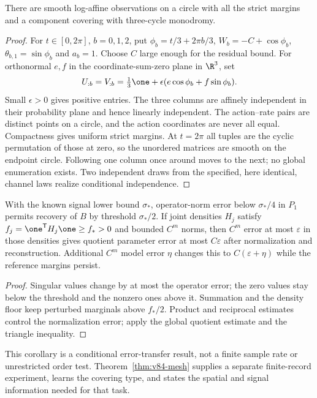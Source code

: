 \begin{proposition}\label{prop:v83-monodromy}
There are smooth log-affine observations on a circle with all the
strict margins and a component covering with three-cycle monodromy.
\end{proposition}
\begin{proof}
For $t\in[0,2\pi]$, $b=0,1,2$, put
$\phi_b=t/3+2\pi b/3$, $W_b=-C+\cos\phi_b$,
$\theta_{b,1}=\sin\phi_b$ and $a_b=1$. Choose $C$ large enough for
the residual bound. For orthonormal $e,f$ in the coordinate-sum-zero
plane in $\R^3$, set
\[
 U_{:b}=V_{:b}=\tfrac13\one+
               \epsilon(e\cos\phi_b+f\sin\phi_b).
\]
Small $\epsilon>0$ gives positive entries. The three columns are
affinely independent in their probability plane and hence linearly
independent. The action--rate pairs are distinct points on a circle,
and the action coordinates are never all equal. Compactness gives
uniform strict margins. At $t=2\pi$ all tuples are the cyclic
permutation of those at zero, so the unordered matrices are smooth
on the endpoint circle. Following one column once around moves to
the next; no global enumeration exists. Two independent draws from
the specified, here identical, channel laws realize conditional
independence.
\end{proof}

\begin{corollary}\label{cor:v83-error}
With the known signal lower bound $\sigma_*$, operator-norm error
below $\sigma_*/4$ in $P_1$ permits recovery of $B$ by threshold
$\sigma_*/2$. If joint densities $H_j$ satisfy
$f_j=\one^{\mathsf T}H_j\one\ge f_*>0$ and bounded $C^m$ norms,
then $C^m$ error at most $\varepsilon$ in those densities gives
quotient parameter error at most $C\varepsilon$ after normalization
and reconstruction. Additional $C^m$ model error $\eta$ changes this
to $C(\varepsilon+\eta)$ while the reference margins persist.
\end{corollary}
\begin{proof}
Singular values change by at most the operator error; the zero values
stay below the threshold and the nonzero ones above it. Summation and
the density floor keep perturbed marginals above $f_*/2$. Product and
reciprocal estimates control the normalization error; apply the global
quotient estimate and the triangle inequality.
\end{proof}
This corollary is a conditional error-transfer result, not a finite
sample rate or unrestricted order test. Theorem~\ref{thm:v84-mesh}
supplies a separate finite-record experiment, learns the covering type,
and states the spatial and signal information needed for that task.
